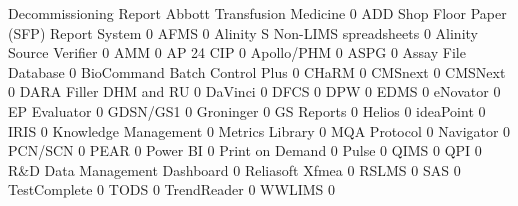 \documentclass{article}
\begin{document}
\begin{Schunk}
\begin{Soutput}
                                           Decommissioning Report
  Abbott Transfusion Medicine                                   0
  ADD Shop Floor Paper (SFP) Report System                      0
  AFMS                                                          0
  Alinity S Non-LIMS spreadsheets                               0
  Alinity Source Verifier                                       0
  AMM                                                           0
  AP 24 CIP                                                     0
  Apollo/PHM                                                    0
  ASPG                                                          0
  Assay File Database                                           0
  BioCommand Batch Control Plus                                 0
  CHaRM                                                         0
  CMSnext                                                       0
  CMSNext                                                       0
  DARA Filler DHM and RU                                        0
  DaVinci                                                       0
  DFCS                                                          0
  DPW                                                           0
  EDMS                                                          0
  eNovator                                                      0
  EP Evaluator                                                  0
  GDSN/GS1                                                      0
  Groninger                                                     0
  GS Reports                                                    0
  Helios                                                        0
  ideaPoint                                                     0
  IRIS                                                          0
  Knowledge Management                                          0
  Metrics Library                                               0
  MQA Protocol                                                  0
  Navigator                                                     0
  PCN/SCN                                                       0
  PEAR                                                          0
  Power BI                                                      0
  Print on Demand                                               0
  Pulse                                                         0
  QIMS                                                          0
  QPI                                                           0
  R&D Data Management Dashboard                                 0
  Reliasoft Xfmea                                               0
  RSLMS                                                         0
  SAS                                                           0
  TestComplete                                                  0
  TODS                                                          0
  TrendReader                                                   0
  WWLIMS                                                        0
                                          

\end{Soutput}
\end{Schunk}
\end{document}
